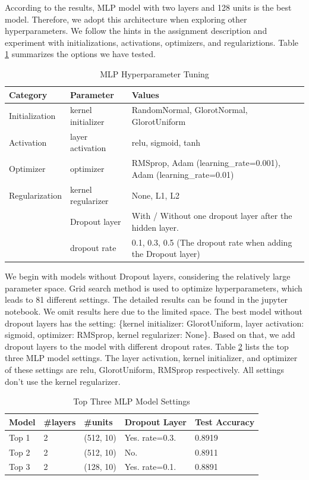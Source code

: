 \documentclass{article}
\begin{document}
\par
According to the results,  MLP model with two layers and 128 units is the best model. Therefore, we adopt this architecture when exploring other hyperparameters. We follow the hints in the assignment description and experiment with initializations, activations, optimizers, and regulariztions. Table \ref{tab:1-hy-mnist} summarizes the options we have tested.
\begin{table}[!ht]
    \centering
    \caption{MLP Hyperparameter Tuning}
    \label{tab:1-hy-mnist}
    \begin{tabular}{lll}
        \toprule
        \textbf{Category} & \textbf{Parameter} & \textbf{Values}\\
        \midrule
        Initialization & kernel initializer & RandomNormal, GlorotNormal, GlorotUniform\\
        Activation & layer activation & relu, sigmoid, tanh\\
        Optimizer & optimizer & RMSprop, Adam (learning_rate=0.001), Adam (learning_rate=0.01)\\
        Regularization & kernel regularizer & None, L1, L2\\
                       & Dropout layer & With / Without one dropout layer after the hidden layer.\\
                       & dropout rate & 0.1, 0.3, 0.5 (The dropout rate when adding the Dropout layer)\\
        \bottomrule
    \end{tabular}
\end{table}
\par
We begin with models without Dropout layers, considering the relatively large parameter space. Grid search method is used to optimize hyperparameters, which leads to 81 different settings. The detailed results can be found in the jupyter notebook. We omit results here due to the limited space. The best model without dropout layers has the setting: \{kernel initializer: GlorotUniform, layer activation: sigmoid, optimizer: RMSprop, kernel regularizer: None\}. Based on that, we add dropout layers to the model with different dropout rates. Table \ref{tab:1-top3-mlp} lists the top three MLP model settings. The layer activation, kernel initializer, and optimizer of these settings are relu, GlorotUniform, RMSprop respectively. All settings don't use the kernel regularizer.
\begin{table}[!ht]
    \centering
    \caption{Top Three MLP Model Settings}
    \label{tab:1-top3-mlp}
    \begin{tabular}{lllll}
        \toprule
        \textbf{Model} & \textbf{\#layers} & \textbf{\#units} & \textbf{Dropout Layer} & \textbf{Test Accuracy}\\
        \midrule
        Top 1 & 2 & (512, 10) & Yes. rate=0.3. & 0.8919\\
        Top 2 & 2 & (512, 10) & No. & 0.8911\\
        Top 3 & 2 & (128, 10) & Yes. rate=0.1. & 0.8891\\
        \bottomrule
    \end{tabular}
\end{table}
\end{document}
